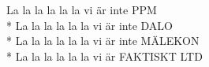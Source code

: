 \begin{SongText}
\begin{SongVerse}
        La la la la la la vi är inte PPM\\*%
        La la la la la la vi är inte DALO\\*%
        La la la la la la vi är inte MÄLEKON\\*%
        La la la la la la vi är FAKTISKT LTD
    \end{SongVerse}
\end{SongText}